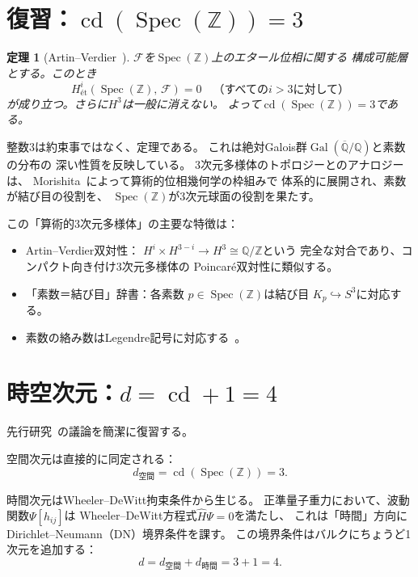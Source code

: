 \documentclass[12pt,a4paper]{article}
\newtheorem{theorem}{定理}[section]
\theoremstyle{definition}
\newcommand{\Spec}{\operatorname{Spec}}
\newcommand{\cd}{\operatorname{cd}}
\newcommand{\Gal}{\operatorname{Gal}}
\newcommand{\Q}{\mathbb{Q}}
\newcommand{\Z}{\mathbb{Z}}
\begin{document}
\section{復習：$\cd(\Spec(\Z))=3$}\label{sec:review}

\begin{theorem}[Artin--Verdier~\cite{ArtinVerdier}]
$\mathscr{F}$を$\Spec(\Z)$上のエタール位相に関する
構成可能層とする。このとき
\[
  H^i_{\text{\'et}}(\Spec(\Z),\,\mathscr{F}) = 0
  \quad\text{（すべての$i > 3$に対して）}
\]
が成り立つ。さらに$H^3$は一般に消えない。
よって$\cd(\Spec(\Z))=3$である。
\end{theorem}

整数$3$は約束事ではなく、定理である。
これは絶対Galois群$\Gal(\overline{\Q}/\Q)$と素数の分布の
深い性質を反映している。
3次元多様体のトポロジーとのアナロジーは、
Morishita~\cite{Morishita}によって算術的位相幾何学の枠組みで
体系的に展開され、素数が結び目の役割を、
$\Spec(\Z)$が3次元球面の役割を果たす。

この「算術的3次元多様体」の主要な特徴は：
\begin{itemize}
  \item Artin--Verdier双対性：
    $H^i \times H^{3-i} \to H^3 \cong \Q/\Z$という
    完全な対合であり、コンパクト向き付け3次元多様体の
    Poincar\'e双対性に類似する。
  \item 「素数＝結び目」辞書：各素数
    $p \in \Spec(\Z)$は結び目
    $K_p \hookrightarrow S^3$に対応する。
  \item 素数の絡み数はLegendre記号に対応する~\cite{Morishita}。
\end{itemize}

\section{時空次元：$d = \cd + 1 = 4$}\label{sec:spacetime}

先行研究~\cite{WB_spacetime}の議論を簡潔に復習する。

空間次元は直接的に同定される：
\begin{equation}
  d_{\text{空間}} = \cd(\Spec(\Z)) = 3.
\end{equation}

時間次元はWheeler--DeWitt拘束条件から生じる。
正準量子重力において、波動関数$\Psi[h_{ij}]$は
Wheeler--DeWitt方程式$\hat{H}\Psi = 0$を満たし、
これは「時間」方向にDirichlet--Neumann（DN）境界条件を課す。
この境界条件はバルクにちょうど1次元を追加する：
\begin{equation}
  d = d_{\text{空間}} + d_{\text{時間}} = 3 + 1 = 4.
\end{equation}
\end{document}
